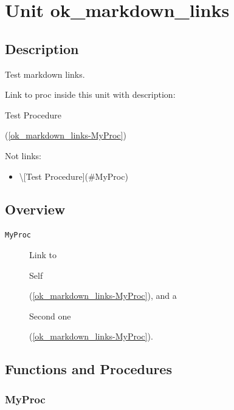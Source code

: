 \documentclass{report}
\newif\ifpdf
\begin{document}
\label{toc}\tableofcontents
\newpage
\newlength{\tmplength}
\chapter{Unit ok{\_}markdown{\_}links}
\label{ok_markdown_links}
\section{Description}
Test markdown links.\hfill\vspace*{1ex}



Link to proc inside this unit with description: \begin{ttfamily}Test Procedure\end{ttfamily}(\ref{ok_markdown_links-MyProc})

Not links:

\begin{itemize}
\item {\textbackslash}[Test Procedure]({\#}MyProc)
\end{itemize}
\section{Overview}
\begin{description}
\item[\texttt{MyProc}]Link to \begin{ttfamily}Self\end{ttfamily}(\ref{ok_markdown_links-MyProc}), and a \begin{ttfamily}Second one\end{ttfamily}(\ref{ok_markdown_links-MyProc}).
\end{description}
\section{Functions and Procedures}
\ifpdf
\subsection*{\large{\textbf{MyProc}}\normalsize\hspace{1ex}\hrulefill}
\else
\end{document}
